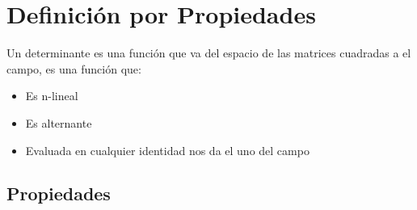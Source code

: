 \documentclass[12pt, fleqn]{report}                             %
\theoremstyle{break}                                            %
\begin{document}
        \vspace{1em}
        \section{Definición por Propiedades}

            Un determinante es una función que va del espacio de las matrices cuadradas
            a el campo, es una función que:
            \begin{itemize}
                \item Es n-lineal
                \item Es alternante
                \item Evaluada en cualquier identidad nos da el uno del campo
            \end{itemize}




            \clearpage
            \subsection{Propiedades}
\end{document}
